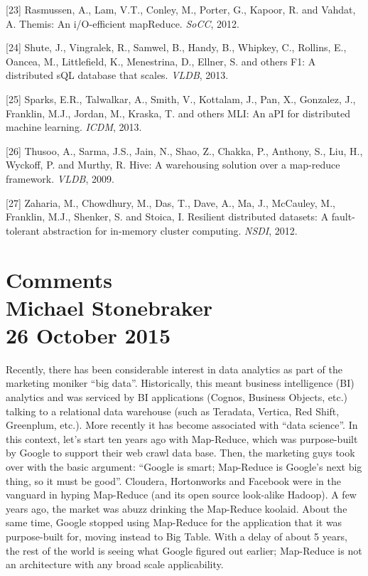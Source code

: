\documentclass[b5paper,11pt,twoside,openright]{book}
\begin{document}
\leavevmode\hypertarget{ref-themismr}{}%
{[}23{]} Rasmussen, A., Lam, V.T., Conley, M., Porter, G., Kapoor, R.
and Vahdat, A. Themis: An i/O-efficient mapReduce. \emph{SoCC}, 2012.

\leavevmode\hypertarget{ref-f1}{}%
{[}24{]} Shute, J., Vingralek, R., Samwel, B., Handy, B., Whipkey, C.,
Rollins, E., Oancea, M., Littlefield, K., Menestrina, D., Ellner, S. and
others F1: A distributed sQL database that scales. \emph{VLDB}, 2013.

\leavevmode\hypertarget{ref-mllib}{}%
{[}25{]} Sparks, E.R., Talwalkar, A., Smith, V., Kottalam, J., Pan, X.,
Gonzalez, J., Franklin, M.J., Jordan, M., Kraska, T. and others MLI: An
aPI for distributed machine learning. \emph{ICDM}, 2013.

\leavevmode\hypertarget{ref-hive}{}%
{[}26{]} Thusoo, A., Sarma, J.S., Jain, N., Shao, Z., Chakka, P.,
Anthony, S., Liu, H., Wyckoff, P. and Murthy, R. Hive: A warehousing
solution over a map-reduce framework. \emph{VLDB}, 2009.

\leavevmode\hypertarget{ref-spark}{}%
{[}27{]} Zaharia, M., Chowdhury, M., Das, T., Dave, A., Ma, J.,
McCauley, M., Franklin, M.J., Shenker, S. and Stoica, I. Resilient
distributed datasets: A fault-tolerant abstraction for in-memory cluster
computing. \emph{NSDI}, 2012.

\section*[Comments]{Comments\\%
{\normalsize Michael Stonebraker}\\%
{\normalsize 26 October 2015}%
}

Recently, there has been considerable interest in data analytics as part
of the marketing moniker ``big data''. Historically, this meant business
intelligence (BI) analytics and was serviced by BI applications (Cognos,
Business Objects, etc.) talking to a relational data warehouse (such as
Teradata, Vertica, Red Shift, Greenplum, etc.). More recently it has
become associated with ``data science''. In this context, let's start
ten years ago with Map-Reduce, which was purpose-built by Google to
support their web crawl data base. Then, the marketing guys took over
with the basic argument: ``Google is smart; Map-Reduce is Google's next
big thing, so it must be good''. Cloudera, Hortonworks and Facebook were
in the vanguard in hyping Map-Reduce (and its open source look-alike
Hadoop). A few years ago, the market was abuzz drinking the Map-Reduce
koolaid. About the same time, Google stopped using Map-Reduce for the
application that it was purpose-built for, moving instead to Big Table.
With a delay of about 5 years, the rest of the world is seeing what
Google figured out earlier; Map-Reduce is not an architecture with any
broad scale applicability.
\end{document}
